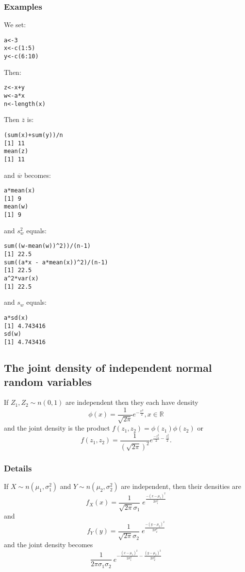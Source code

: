 \documentclass[12pt,a4paper]{article}
\theoremstyle{regla}
\theoremstyle{remark}
\theoremstyle{definition}
\theoremstyle{nonumberbreak}
\begin{document}
\subsubsection{Examples}
\begin{xmpl}
We set:
\begin{lstlisting}
a<-3
x<-c(1:5)
y<-c(6:10)
\end{lstlisting}

Then:
\begin{lstlisting}
z<-x+y
w<-a*x
n<-length(x)
\end{lstlisting}

Then $\overline{z}$ is:
\begin{lstlisting}
(sum(x)+sum(y))/n 
[1] 11
mean(z) 
[1] 11
\end{lstlisting}

and $\overline{w}$ becomes:
\begin{lstlisting}
a*mean(x)
[1] 9
mean(w)
[1] 9
\end{lstlisting}

and $s_w^2$ equals:
\begin{lstlisting}
sum((w-mean(w))^2))/(n-1)
[1] 22.5
sum((a*x - a*mean(x))^2)/(n-1)
[1] 22.5
a^2*var(x)
[1] 22.5
\end{lstlisting}

and $s_w$ equals:
\begin{lstlisting}
a*sd(x)
[1] 4.743416
sd(w)
[1] 4.743416
\end{lstlisting}
\end{xmpl}

\subsection{The joint density of independent normal random variables}
\begin{fbox}
\begin{minipage}{0.97\textwidth}
If $Z_1, Z_2 \sim n(0,1)$ are independent then they each have density\\
$$\phi(x)=\frac{1}{\sqrt{2\pi}}e^{-\frac{x^2}{2}},x\in\mathbb{R}$$
and the joint density is the product $f(z_1,z_2)=\phi(z_1)\phi(z_2)$ or
$$f(z_1,z_2)=\frac{1}{(\sqrt{2\pi})^2} e^{\frac{-z_1^2}{2}-\frac{z_2^2}{2}} .$$
\end{minipage}
\end{fbox}
\subsubsection{Details}
If $X\sim n (\mu_1,\sigma_1^2)$ and $Y\sim n(\mu_2, \sigma_2^2)$ are independent, then their densities are
$$
f_X (x)= \frac{1}{\sqrt{2\pi}\sigma_1} \; e^\frac{-(x-\mu_1)^2}{2\sigma_1^2}$$ 
and
$$
f_Y(y) = \frac{1}{\sqrt{2\pi}\sigma_2} \; e^\frac{-(y-\mu_2)^2}{2\sigma_2^2}$$ 
and the joint density becomes\\
$$\frac{1}{2\pi\sigma_1\sigma_2} \: e^{-\frac{(x-\mu_1)^2}{2\sigma_1^2}-\frac{(y-\mu_2)^2}{2\sigma_2^2}}$$
\end{document}
